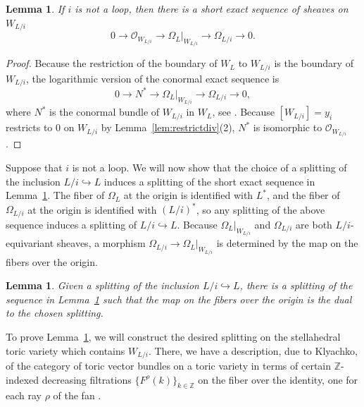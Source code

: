 \documentclass{amsart}
\newtheorem{lemma}[theorem]{Lemma}
\theoremstyle{definition}
\begin{document}
\begin{lemma}\label{lem:restriction}
If $i$ is not a loop, then there is a short exact sequence of sheaves on $W_{L/i}$
$$0 \to \mathcal{O}_{W_{L/i}} \to \Omega_L|_{W_{L/i}} \to \Omega_{L/i} \to 0.$$
\end{lemma}

\begin{proof}
Because the restriction of the boundary of $W_L$ to $W_{L/i}$ is the boundary of $W_{L/i}$, the logarithmic version of the conormal exact sequence is
$$0 \to N^{*} \to \Omega_{L}|_{W_{L/i}} \to \Omega_{L/i} \to 0,$$
where $N^{*}$ is the conormal bundle of $W_{L/i}$ in $W_L$, see 
\cite[1.1]{Olsson}. Because $[W_{L/i}] = y_i$ restricts to $0$ on $W_{L/i}$ by Lemma~\ref{lem:restrictdiv}(2), $N^{*}$ is isomorphic to $\mathcal{O}_{W_{L/i}}$. 
\end{proof}

Suppose that $i$ is not a loop. We will now show that the choice of a splitting of the inclusion $L/i \hookrightarrow L$ induces a splitting of the short exact sequence in Lemma~\ref{lem:restriction}. The fiber of $\Omega_L$ at the origin is identified with $L^*$, and the fiber of $\Omega_{L/i}$ at the origin is identified with $(L/i)^*$, so any splitting of the above sequence induces a splitting of $L/i \hookrightarrow L$. Because $\Omega_{L}|_{W_{L/i}}$ and $\Omega_{L/i}$ are both $L/i$-equivariant sheaves, a morphism $\Omega_{L/i} \to \Omega_L|_{W_{L/i}}$ is determined by the map on the fibers over the origin. 

\begin{lemma}\label{lem:split}
Given a splitting of the inclusion $L/i \hookrightarrow L$, there is a splitting of the sequence in Lemma~\ref{lem:restriction} such that the map on the fibers over the origin is the dual to the chosen splitting. 
\end{lemma}

To prove Lemma~\ref{lem:split}, we will construct the desired splitting 
on the stellahedral toric variety which contains $W_{L/i}$. There, we 
have a description, due to Klyachko, of the category of toric vector 
bundles on a toric variety in terms of certain $\mathbb{Z}$-indexed 
decreasing filtrations $\{F^{\rho}(k)\}_{k \in \mathbb{Z}}$ on the fiber 
over the identity, one for each ray $\rho$ of the fan \cite{KlyachkoVB}. 
\end{document}
